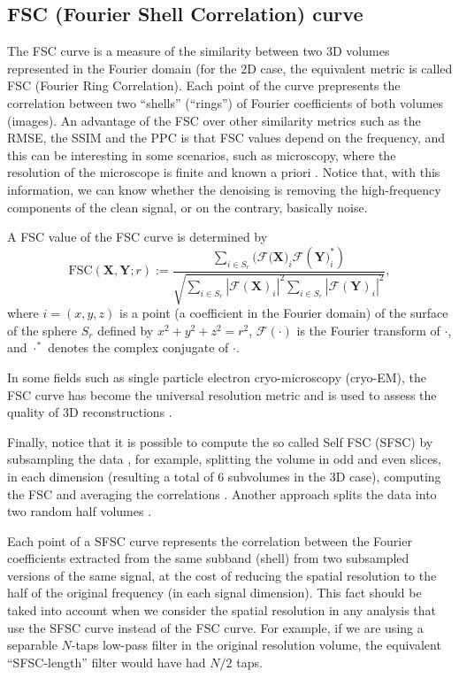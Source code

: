\documentclass{article}
\begin{document}
\subsection{FSC (Fourier Shell Correlation) curve}
The FSC curve is a measure of the similarity between two 3D volumes
represented in the Fourier domain \cite{verbeke2024self} (for the 2D
case, the equivalent metric is called FSC (Fourier Ring
Correlation). Each point of the curve prepresents the correlation
between two ``shells'' (``rings'') of Fourier coefficients of both
volumes (images). An advantage of the FSC over other similarity
metrics such as the RMSE, the SSIM and the PPC is that FSC values
depend on the frequency, and this can be interesting in some
scenarios, such as microscopy, where the resolution of the microscope
is finite and known a priori \cite{nieuwenhuizen2013measuring}. Notice
that, with this information, we can know whether the denoising is
removing the high-frequency components of the clean signal, or on the
contrary, basically noise.

A FSC value of the FSC curve is determined by~\cite{verbeke2024self}
\begin{equation}
\text{FSC}(\mathbf{X}, \mathbf{Y}; r) := \frac{\sum_{i \in S_r} (\mathcal{F}(\mathbf{X)}_i \mathcal{F}(\mathbf{Y)}_i^*)}{\sqrt{\sum_{i \in S_r} |\mathcal{F}(\mathbf{X})_i|^2 \sum_{i \in S_r} |\mathcal{F}(\mathbf{Y})_i|^2}},
\end{equation}
where $i=(x, y, z)$ is a point (a coefficient in the Fourier domain)
of the surface of the sphere $S_r$ defined by $x^2+y^2+z^2=r^2$,
$\mathcal{F}(\cdot)$ is the Fourier transform of $\cdot$, and
$\cdot^*$ denotes the complex conjugate of $\cdot$.

In some fields such as single particle electron cryo-microscopy
(cryo-EM), the FSC curve has become the universal resolution metric
and is used to assess the quality of 3D reconstructions
\cite{rosenthal2003optimal,scheres2012prevention}.

Finally, notice that it is possible to compute the so called Self FSC
(SFSC) by subsampling the data \cite{koho2019fourier}, for example,
splitting the volume in odd and even slices, in each dimension
(resulting a total of 6 subvolumes in the 3D case), computing the FSC
and averaging the correlations \cite{verbeke2024self}. Another
approach splits the data into two random half volumes
\cite{verbeke2024self}.

Each point of a SFSC curve represents the correlation between the
Fourier coefficients extracted from the same subband (shell) from two
subsampled versions of the same signal, at the cost of reducing the
spatial resolution to the half of the original frequency (in each
signal dimension). This fact should be taked into account when we
consider the spatial resolution in any analysis that use the SFSC
curve instead of the FSC curve. For example, if we are using a
separable $N$-taps low-pass filter in the original resolution volume,
the equivalent ``SFSC-length'' filter would have had $N/2$ taps.
\end{document}

